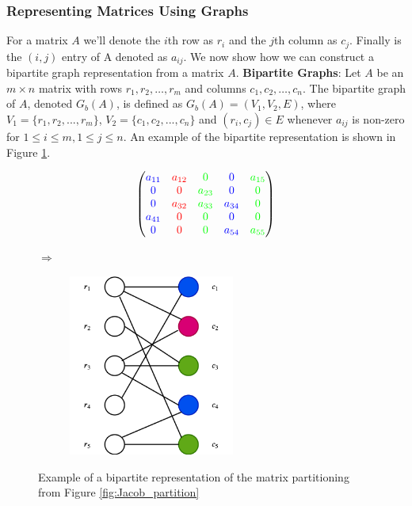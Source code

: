 \subsubsection*{Representing Matrices Using Graphs}
For a matrix $A$ we'll denote the $i$th row as $r_i$ and the $j$th column
as $c_j$. Finally is the $(i,j)$ entry of A denoted as $a_{ij}$. We now show how we can
construct a bipartite graph representation from a matrix $A$. \newline 
\textbf{Bipartite Graphs}: Let $A$ be an $m \times n$ matrix with rows $r_1, r_2, \dots, r_m$ and columns $c_1, c_2, \dots, c_n$. The bipartite graph of $A$, denoted $G_b(A)$, is defined as $G_b(A) = (V_1, V_2, E)$, where $V_1 = \{r_1, r_2, ..., r_m\}$, $V_2 = \{c_1, c_2, ..., c_n\}$ and $(r_i, c_j) \in E$ whenever $a_{ij}$ is non-zero for $1 \leq i \leq m, 1 \leq j \leq n$.  An example of the bipartite representation is shown in Figure \ref{fig:bipartite}. 
\begin{figure}[H]
	\centering
	\begin{subfigure}{0.45\linewidth}
	$$ \left(\begin{matrix}
{\color{blue} a_{11}} & {\color{red} a_{12}} & {\color{green} 0 }        &  {\color{blue} 0 }       & {\color{green} a_{15}} \\
{\color{blue} 0}        & {\color{red} 0 }       & {\color{green} a_{23}}  &  {\color{blue} 0 }      & {\color{green} 0} \\
{\color{blue} 0}        & {\color{red} a_{32}} &  {\color{green} a_{33}}  & {\color{blue} a_{34}} & {\color{green} 0 } \\
{\color{blue} a_{41}} & {\color{red} 0 }       & {\color{green} 0 }         & {\color{blue} 0 }        & {\color{green} 0} \\
{\color{blue} 0 }       & {\color{red} 0 }       & {\color{green} 0 }         & {\color{blue} a_{54}} & {\color{green} a_{55} }
\end{matrix}\right) $$
	\end{subfigure}
	 $\Rightarrow$ \hfill 
	\begin{subfigure}{0.45\linewidth}
	\includegraphics[width=0.6\textwidth]{pics/bipartite.png} 
	\end{subfigure}
     \caption{Example of a bipartite representation of the matrix partitioning from Figure \ref{fig:Jacob_partition}}
	\label{fig:bipartite}
\end{figure}
